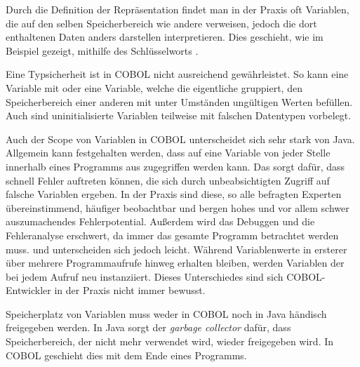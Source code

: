 Durch die Definition der Repräsentation findet man in der Praxis oft Variablen, die auf den selben Speicherbereich wie andere verweisen, jedoch die dort enthaltenen Daten anders darstellen \bzw interpretieren. Dies geschieht, wie im Beispiel gezeigt, mithilfe des Schlüsselworts .

Eine Typsicherheit ist in COBOL nicht ausreichend gewährleistet. So kann eine Variable mit  oder eine Variable, welche die eigentliche gruppiert, den Speicherbereich einer anderen mit unter Umständen ungültigen Werten befüllen. Auch sind uninitialisierte Variablen teilweise mit falschen Datentypen vorbelegt. 

Auch der Scope von Variablen in COBOL unterscheidet sich sehr stark von Java. Allgemein kann festgehalten werden, dass auf eine Variable von jeder Stelle innerhalb eines Programms aus zugegriffen werden kann. Das sorgt dafür, dass schnell Fehler auftreten können, die sich durch unbeabsichtigten Zugriff auf falsche Variablen ergeben. In der Praxis sind diese, so alle befragten Experten übereinstimmend, häufiger beobachtbar und bergen hohes und vor allem schwer auszumachendes Fehlerpotential. Außerdem wird das Debuggen und die Fehleranalyse erschwert, da immer das gesamte Programm betrachtet werden muss.  und  unterscheiden sich jedoch leicht. Während Variablenwerte in ersterer über mehrere Programmaufrufe hinweg erhalten bleiben, werden Variablen der  bei jedem Aufruf neu instanziiert. Dieses Unterschiedes sind sich COBOL-Entwickler in der Praxis nicht immer bewusst.

Speicherplatz von Variablen muss weder in COBOL noch in Java händisch freigegeben werden. In Java sorgt der \textit{garbage collector} dafür, dass Speicherbereich, der nicht mehr verwendet wird, wieder freigegeben wird. In COBOL geschieht dies mit dem Ende eines Programms. 